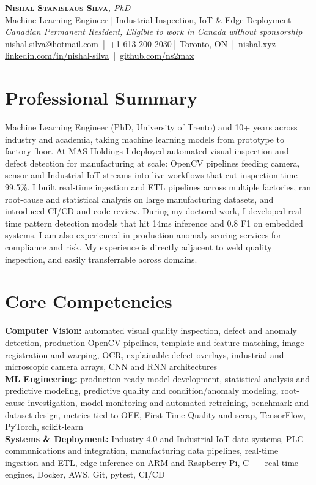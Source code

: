 \documentclass[11pt]{article}
\makeatletter
\newcommand{\cvName}{Nishal Stanislaus Silva}
\newcommand{\cvEmail}{nishal.silva@hotmail.com}
\newcommand{\cvPhone}{+1 613 200 2030}
\newcommand{\cvCity}{Toronto, ON}
\newcommand{\cvSite}{https://nishal.xyz}
\newcommand{\cvLinkedIn}{https://www.linkedin.com/in/nishal-silva}
\newcommand{\cvGitHub}{https://github.com/ns2max}
\newcommand{\cvStatus}{Canadian Permanent Resident, Eligible to work in Canada without sponsorship}
\newcommand{\cvTagline}{Machine Learning Engineer | Industrial Inspection, IoT \& Edge Deployment}
\makeatother
\begin{document}
\pagestyle{empty}
\begin{center}
    {\LARGE \scshape \textbf{\cvName}}{\large \textit{, PhD}}\\[1pt]
    {\small \cvTagline}\\[1pt]
    {\footnotesize\textit{\cvStatus}}\\[1pt]
    {\small
    \href{mailto:\cvEmail}{\cvEmail} \,|\, \cvPhone \,|\, \cvCity
    \,|\, \href{\cvSite}{nishal.xyz} \,|\, \href{\cvLinkedIn}{linkedin.com/in/nishal-silva}
    \,|\, \href{\cvGitHub}{github.com/ns2max}}
\end{center}

\section*{Professional Summary}

Machine Learning Engineer (PhD, University of Trento) and 10+ years across industry and academia, taking machine learning models from prototype to factory floor. At MAS Holdings I deployed automated visual inspection and defect detection for manufacturing at scale: OpenCV pipelines feeding camera, sensor and Industrial IoT streams into live workflows that cut inspection time 99.5\%. I built real-time ingestion and ETL pipelines across multiple factories, ran root-cause and statistical analysis on large manufacturing datasets, and introduced CI/CD and code review. During my doctoral work, I developed real-time pattern detection models that hit 14ms inference and 0.8 F1 on embedded systems. I am also experienced in production anomaly-scoring services for compliance and risk. My experience is directly adjacent to weld quality inspection, and easily transferrable across domains.

\section*{Core Competencies}

\textbf{Computer Vision:} automated visual quality inspection, defect and anomaly detection, production OpenCV pipelines, template and feature matching, image registration and warping, OCR, explainable defect overlays, industrial and microscopic camera arrays, CNN and RNN architectures\\
\textbf{ML Engineering:} production-ready model development, statistical analysis and predictive modeling, predictive quality and condition/anomaly modeling, root-cause investigation, model monitoring and automated retraining, benchmark and dataset design, metrics tied to OEE, First Time Quality and scrap, TensorFlow, PyTorch, scikit-learn\\
\textbf{Systems \& Deployment:} Industry 4.0 and Industrial IoT data systems, PLC communications and integration, manufacturing data pipelines, real-time ingestion and ETL, edge inference on ARM and Raspberry Pi, C++ real-time engines, Docker, AWS, Git, pytest, CI/CD
\end{document}
